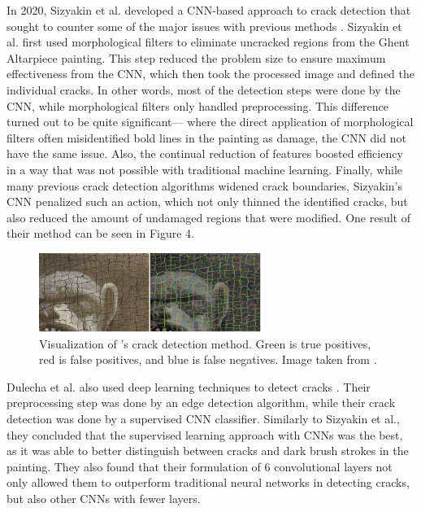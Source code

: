 \documentclass[a4paper,11pt]{article}
\begin{document}
In 2020, Sizyakin et al. developed a CNN-based approach to crack detection that sought to counter some of the major issues with previous methods \cite{sizyakin}. Sizyakin et al. first used morphological filters to eliminate uncracked regions from the Ghent Altarpiece painting. This step reduced the problem size to ensure maximum effectiveness from the CNN, which then took the processed image and defined the individual cracks. In other words, most of the detection steps were done by the CNN, while morphological filters only handled preprocessing. This difference turned out to be quite significant— where the direct application of morphological filters often misidentified bold lines in the painting as damage, the CNN did not have the same issue. Also, the continual reduction of features boosted efficiency in a way that was not possible with traditional machine learning. Finally, while many previous crack detection algorithms widened crack boundaries, Sizyakin's CNN penalized such an action, which not only thinned the identified cracks, but also reduced the amount of undamaged regions that were modified. One result of their method can be seen in Figure 4.

\begin{figure}[h]
    \centering
    \includegraphics[width=0.65\textwidth]{cracked.png}
    \caption{Visualization of \cite{sizyakin}'s crack detection method. Green is true positives, red is false positives, and blue is false negatives. Image taken from \cite{sizyakin}.}
\end{figure}

Dulecha et al. also used deep learning techniques to detect cracks \cite{dulecha}. Their preprocessing step was done by an edge detection algorithm, while their crack detection was done by a supervised CNN classifier. Similarly to Sizyakin et al., they concluded that the supervised learning approach with CNNs was the best, as it was able to better distinguish between cracks and dark brush strokes in the painting. They also found that their formulation of 6 convolutional layers not only allowed them to outperform traditional neural networks in detecting cracks, but also other CNNs with fewer layers. 
\end{document}
